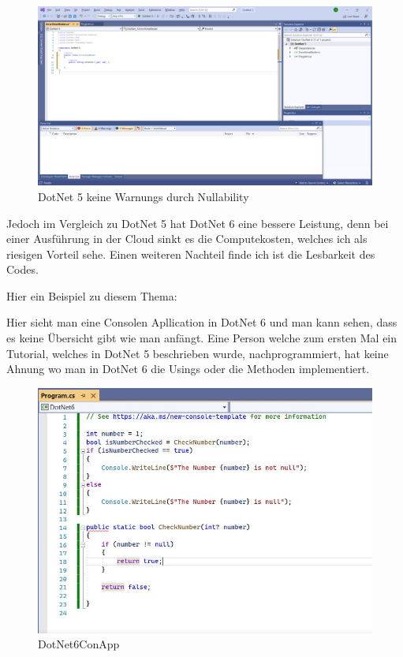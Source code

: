 \begin{figure}[H]
    \centering
    \includegraphics[width=1\textwidth]{pics/DotNet5Nullability.png}
    \caption{DotNet 5 keine Warnungs durch Nullability}
\end{figure}




Jedoch im Vergleich zu DotNet 5 hat DotNet 6 eine bessere Leistung, denn bei einer Ausführung in der Cloud sinkt es die Computekosten, welches ich als riesigen Vorteil sehe.
Einen weiteren Nachteil finde ich ist die Lesbarkeit des Codes.

Hier ein Beispiel zu diesem Thema:

Hier sieht man eine Consolen Apllication in DotNet 6 und man kann sehen,
dass es keine Übersicht gibt wie man anfängt. Eine Person welche zum ersten Mal ein Tutorial, welches in DotNet 5 beschrieben wurde, nachprogrammiert, hat keine Ahnung 
wo man in DotNet 6 die Usings oder die Methoden implementiert. 




\begin{figure}[H]
    \centering
    \includegraphics[width=1\textwidth]{./pics/DotNet6ConApp.JPG}
    \caption{DotNet6ConApp}
\end{figure}



